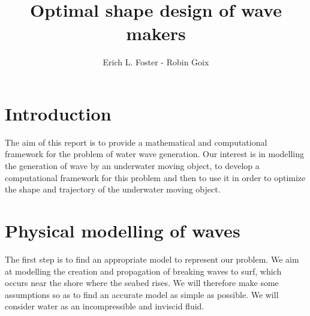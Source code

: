 \documentclass[11pt,a4paper]{article}
\author{Erich L. Foster - Robin Goix}
\title{Optimal shape design of wave makers}
\begin{document}
	\maketitle

	\tableofcontents
	
	\pagebreak
	
	\section*{Introduction}
	The aim of this report is to provide a mathematical and computational framework for the problem of water wave generation. Our interest is in modelling the generation of wave by an underwater moving object, to develop a computational framework for this problem and then to use it in order to optimize the shape and trajectory of the underwater moving object.
		
		\pagebreak
		
	\section{Physical modelling of waves}
		The first step is to find an appropriate model to represent our problem. We aim at modelling the creation and propagation of breaking waves to surf, which occurs near the shore where the seabed rises. We will therefore make some assumptions so as to find an accurate model as simple as possible. We will consider water as an incompressible and inviscid fluid.
		
\end{document}
